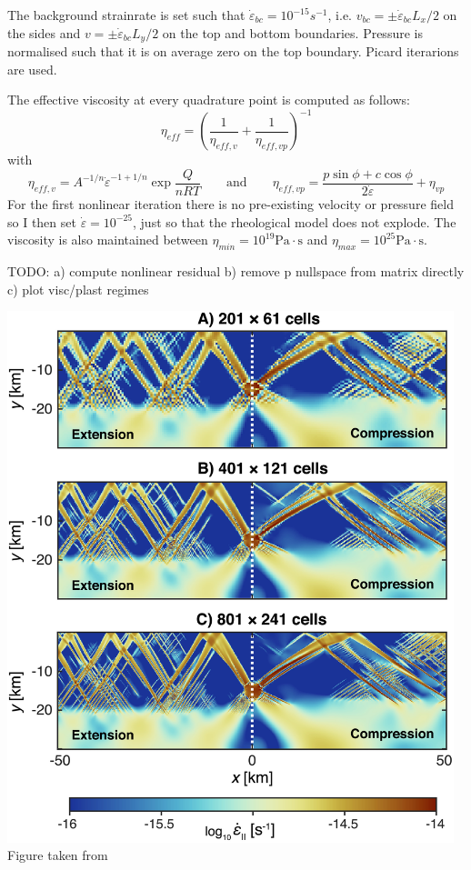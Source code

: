 The background strainrate is set such that $\dot{\varepsilon}_{bc}=10^{-15}s^{-1}$, i.e. 
$v_{bc}=\pm \dot{\varepsilon}_{bc} L_x/2 $ on the sides and $v=\pm \dot{\varepsilon}_{bc} L_y/2 $
on the top and bottom boundaries.
Pressure is normalised such that it is on average zero on the top boundary. 
Picard iterarions are used. 

The effective viscosity at every quadrature point is computed as follows:
\[
\eta_{eff} = \left( \frac{1}{\eta_{eff,v}}  + \frac{1}{\eta_{eff,vp}}  \right)^{-1}
\]
with 
\[
\eta_{eff,v} = A^{-1/n} \dot{\varepsilon}^{-1+1/n} \exp \frac{Q}{nRT}
\qquad
\text{and}
\qquad
\eta_{eff,vp} = \frac{p \sin \phi + c \cos \phi}{2 \dot{\varepsilon}}  + \eta_{vp}
\]
For the first nonlinear iteration there is no pre-existing velocity or pressure field so 
I then set $\dot{\varepsilon}=10^{-25}$, just so that the rheological model does not explode. 
The viscosity is also maintained between $\eta_{min}=10^{19}\text{Pa}\cdot\text{s}$ 
and $\eta_{max}=10^{25}\text{Pa}\cdot\text{s}$.

TODO: a) compute nonlinear residual b) remove p nullspace from matrix directly c) plot visc/plast regimes

\begin{center}
\includegraphics[width=13cm]{python_codes/fieldstone_70/images/fig2}\\
{\captionfont Figure taken from \cite{dudy20}}
\end{center}


